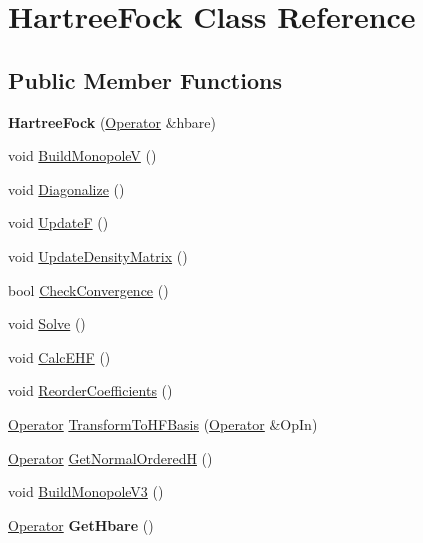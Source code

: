 \hypertarget{classHartreeFock}{\section{Hartree\-Fock Class Reference}
\label{classHartreeFock}
}
\subsection*{Public Member Functions}
\begin{DoxyCompactItemize}
\item 
\hypertarget{classHartreeFock_ad39d695b75dc9c6aa2f0e1ff81d1adc5}{{\bfseries Hartree\-Fock} (\hyperlink{classOperator}{Operator} \&hbare)}\label{classHartreeFock_ad39d695b75dc9c6aa2f0e1ff81d1adc5}

\item 
void \hyperlink{classHartreeFock_a3d6bac9b4403e4bc599a89ad0c9b6056}{Build\-Monopole\-V} ()
\item 
void \hyperlink{classHartreeFock_a00f7b0c4cb7373a3f1a69ca27a4dfaed}{Diagonalize} ()
\item 
void \hyperlink{classHartreeFock_a84fe0eb16f6e5835c920bf8fa98c4442}{Update\-F} ()
\item 
void \hyperlink{classHartreeFock_aad38c905e7e9f9e9757b5800e6910c61}{Update\-Density\-Matrix} ()
\item 
bool \hyperlink{classHartreeFock_a35ab9c4f96e68b1c9acea1d1407ecc60}{Check\-Convergence} ()
\item 
void \hyperlink{classHartreeFock_a0666507747c17845ab4f74b97414703c}{Solve} ()
\item 
void \hyperlink{classHartreeFock_aef506c5c5bc0f317ceb9c71bdc44d62b}{Calc\-E\-H\-F} ()
\item 
void \hyperlink{classHartreeFock_a2eb6754f57250a03a2e1bd3e2aef4daf}{Reorder\-Coefficients} ()
\item 
\hyperlink{classOperator}{Operator} \hyperlink{classHartreeFock_a55914915cea16669e549025c244b62d0}{Transform\-To\-H\-F\-Basis} (\hyperlink{classOperator}{Operator} \&Op\-In)
\item 
\hyperlink{classOperator}{Operator} \hyperlink{classHartreeFock_a17bdb52033e2f62bba72ea86bc196b37}{Get\-Normal\-Ordered\-H} ()
\item 
void \hyperlink{classHartreeFock_a1c146af25a09f427cc626d877ec6e518}{Build\-Monopole\-V3} ()
\item 
\hypertarget{classHartreeFock_a7f2a07edc3ccaa0cf9bbc0faadfd9ddf}{\hyperlink{classOperator}{Operator} {\bfseries Get\-Hbare} ()}\label{classHartreeFock_a7f2a07edc3ccaa0cf9bbc0faadfd9ddf}

\end{DoxyCompactItemize}
